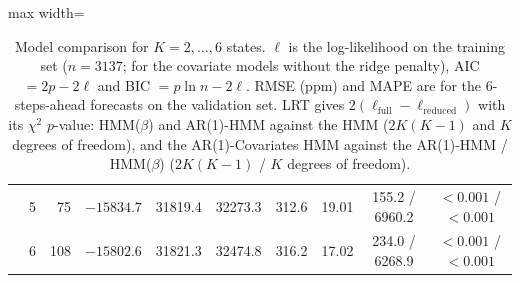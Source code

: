 \begin{table}[ht]
\begin{adjustbox}{max width=\textwidth}
\begin{tabular}{llrrrrrrcc}
 & 5 & 75 & $-15834.7$ & 31819.4 & 32273.3 & 312.6 & 19.01 & 155.2 / 6960.2 & $<0.001$ / $<0.001$ \\
 & 6 & 108 & $-15802.6$ & 31821.3 & 32474.8 & 316.2 & 17.02 & 234.0 / 6268.9 & $<0.001$ / $<0.001$ \\
\hline
\end{tabular}
\end{adjustbox}
\caption{Model comparison for $K = 2, \dots, 6$ states. $\ell$ is the log-likelihood on the training set ($n = 3137$; for the covariate models without the ridge penalty), AIC $= 2p - 2\ell$ and BIC $= p\ln n - 2\ell$. RMSE (ppm) and MAPE are for the 6-steps-ahead forecasts on the validation set. LRT gives $2(\ell_{\mathrm{full}} - \ell_{\mathrm{reduced}})$ with its $\chi^2$ $p$-value: HMM($\beta$) and AR(1)-HMM against the HMM ($2K(K-1)$ and $K$ degrees of freedom), and the AR(1)-Covariates HMM against the AR(1)-HMM / HMM($\beta$) ($2K(K-1)$ / $K$ degrees of freedom).}
\label{tab:model_comparison_room_015_calibrated_anchor_val_h6}
\end{table}
